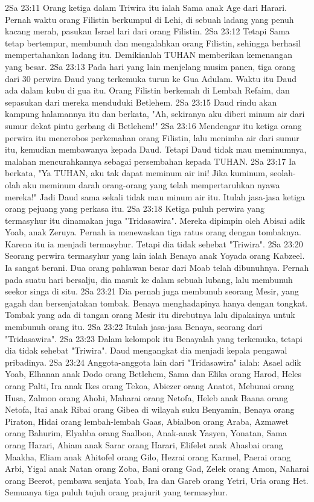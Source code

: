 2Sa 23:11  Orang ketiga dalam Triwira itu ialah Sama anak Age dari Harari. Pernah waktu orang Filistin berkumpul di Lehi, di sebuah ladang yang penuh kacang merah, pasukan Israel lari dari orang Filistin.
2Sa 23:12  Tetapi Sama tetap bertempur, membunuh dan mengalahkan orang Filistin, sehingga berhasil mempertahankan ladang itu. Demikianlah TUHAN memberikan kemenangan yang besar.
2Sa 23:13  Pada hari yang lain menjelang musim panen, tiga orang dari 30 perwira Daud yang terkemuka turun ke Gua Adulam. Waktu itu Daud ada dalam kubu di gua itu. Orang Filistin berkemah di Lembah Refaim, dan sepasukan dari mereka menduduki Betlehem.
2Sa 23:15  Daud rindu akan kampung halamannya itu dan berkata, "Ah, sekiranya aku diberi minum air dari sumur dekat pintu gerbang di Betlehem!"
2Sa 23:16  Mendengar itu ketiga orang perwira itu menerobos perkemahan orang Filistin, lalu menimba air dari sumur itu, kemudian membawanya kepada Daud. Tetapi Daud tidak mau meminumnya, malahan mencurahkannya sebagai persembahan kepada TUHAN.
2Sa 23:17  Ia berkata, "Ya TUHAN, aku tak dapat meminum air ini! Jika kuminum, seolah-olah aku meminum darah orang-orang yang telah mempertaruhkan nyawa mereka!" Jadi Daud sama sekali tidak mau minum air itu. Itulah jasa-jasa ketiga orang pejuang yang perkasa itu.
2Sa 23:18  Ketiga puluh perwira yang termasyhur itu dinamakan juga "Tridasawira". Mereka dipimpin oleh Abisai adik Yoab, anak Zeruya. Pernah ia menewaskan tiga ratus orang dengan tombaknya. Karena itu ia menjadi termasyhur. Tetapi dia tidak sehebat "Triwira".
2Sa 23:20  Seorang perwira termasyhur yang lain ialah Benaya anak Yoyada orang Kabzeel. Ia sangat berani. Dua orang pahlawan besar dari Moab telah dibunuhnya. Pernah pada suatu hari bersalju, dia masuk ke dalam sebuah lubang, lalu membunuh seekor singa di situ.
2Sa 23:21  Dia pernah juga membunuh seorang Mesir, yang gagah dan bersenjatakan tombak. Benaya menghadapinya hanya dengan tongkat. Tombak yang ada di tangan orang Mesir itu direbutnya lalu dipakainya untuk membunuh orang itu.
2Sa 23:22  Itulah jasa-jasa Benaya, seorang dari "Tridasawira".
2Sa 23:23  Dalam kelompok itu Benayalah yang terkemuka, tetapi dia tidak sehebat "Triwira". Daud mengangkat dia menjadi kepala pengawal pribadinya.
2Sa 23:24  Anggota-anggota lain dari "Tridasawira" ialah: Asael adik Yoab, Elhanan anak Dodo orang Betlehem, Sama dan Elika orang Harod, Heles orang Palti, Ira anak Ikes orang Tekoa, Abiezer orang Anatot, Mebunai orang Husa, Zalmon orang Ahohi, Maharai orang Netofa, Heleb anak Baana orang Netofa, Itai anak Ribai orang Gibea di wilayah suku Benyamin, Benaya orang Piraton, Hidai orang lembah-lembah Gaas, Abialbon orang Araba, Azmawet orang Bahurim, Elyahba orang Saalbon, Anak-anak Yasyen, Yonatan, Sama orang Harari, Ahiam anak Sarar orang Harari, Elifelet anak Ahasbai orang Maakha, Eliam anak Ahitofel orang Gilo, Hezrai orang Karmel, Paerai orang Arbi, Yigal anak Natan orang Zoba, Bani orang Gad, Zelek orang Amon, Naharai orang Beerot, pembawa senjata Yoab, Ira dan Gareb orang Yetri, Uria orang Het. Semuanya tiga puluh tujuh orang prajurit yang termasyhur.
